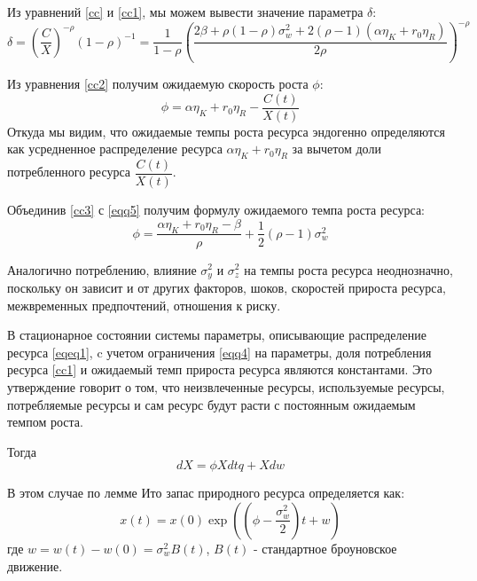 \documentclass[12pt,a4paper, oneside]{extreport}
\begin{document}
Из уравнений \eqref{cc} и  \eqref{cc1}, мы можем вывести значение параметра $ \delta $:
\begin{equation}\label{tt2}
\delta = \left( \dfrac{C}{X}\right)^{-\rho}  (1-\rho)^{-1} = \dfrac{1}{1-\rho} \left(\dfrac{2\beta + \rho(1-\rho)\sigma_{w}^2 + 2 (\rho - 1 ) (\alpha \eta_K + r_0 \eta_R)}{2\rho}  \right)  ^{-\rho}
\end{equation}


Из уравнения \eqref{cc2}  получим  ожидаемую скорость роста $ \phi $:
\begin{equation}\label{сс3}
\phi = \alpha\eta_K + r_0 \eta_R - \dfrac{C(t)}{X(t)}
\end{equation}
Откуда мы видим, что ожидаемые темпы роста ресурса  эндогенно определяются как усредненное  распределение  ресурса $ \alpha\eta_K + r_0 \eta_R $ за вычетом доли потребленного ресурса $  \dfrac{C(t)}{X(t)}  $. 
	
	Объединив \eqref{cc3}  с \eqref{eqq5} получим формулу ожидаемого темпа роста ресурса: 
	\begin{equation}\label{key}
	\phi = \dfrac{\alpha \eta_K + r_0 \eta_R - \beta}{\rho} + \dfrac{1}{2} (\rho -1	) \sigma_{w}^2
		\end{equation}

Аналогично потреблению, влияние $ \sigma_{y}^2 $ и $  \sigma_{z}^2 $   на темпы роста ресурса   неоднозначно, поскольку он  зависит и от других  факторов, шоков, скоростей прироста ресурса, межвременных предпочтений, отношения к риску.

В стационарное состоянии  системы параметры, описывающие распределение  ресурса  \eqref{eqeq1}, c учетом ограничения \eqref{eqq4} на параметры,  доля потребления ресурса   \eqref{cc1}  и  ожидаемый  темп прироста  ресурса являются константами. 
Это утверждение говорит о том, что неизвлеченные  ресурсы, используемые ресурсы, потребляемые  ресурсы  и сам ресурс будут расти с постоянным  ожидаемым темпом роста.  

Тогда 
\begin{equation}\label{key}
dX = \phi Xdt q + Xdw
\end{equation}

В этом случае по лемме Ито  запас природного ресурса определяется как:  
\begin{equation}\label{qqq}
x(t) =  x(0) \exp \left(    \left(  \phi - \dfrac{\sigma^2_w}{2} \right)    t +  w  \right) 
\end{equation}
где $ w = w(t) - w(0) = \sigma^2_w B(t) $, $ B(t) $ - стандартное броуновское движение. 
\end{document}
